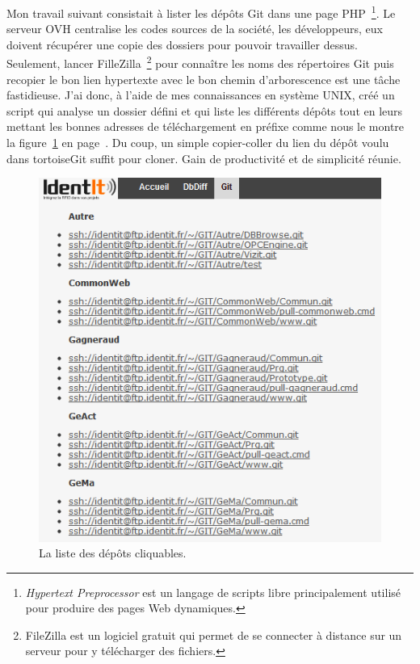     Mon travail suivant consistait à lister les dépôts Git dans une page
    PHP\, \footnote{\emph{Hypertext Preprocessor} est un langage de scripts
    libre principalement utilisé pour produire des pages Web dynamiques.}.
    Le serveur OVH centralise les codes sources de la société, les
    développeurs, eux doivent récupérer une copie des dossiers pour pouvoir
    travailler dessus. Seulement, lancer FilleZilla\, \footnote{FileZilla
    est un logiciel gratuit qui permet de se connecter à distance sur un
    serveur pour y télécharger des fichiers.} pour connaître les noms des
    répertoires Git puis recopier le bon lien hypertexte avec le bon chemin
    d'arborescence est une tâche fastidieuse.  J'ai donc, à l'aide de mes
    connaissances en système UNIX, créé un script qui analyse un dossier
    défini et qui liste les différents dépôts tout en leurs mettant les
    bonnes adresses de téléchargement en préfixe comme nous le montre la
    figure~\ref{repo} en page~\pageref{repo}. Du coup, un simple
    copier-coller du lien du dépôt voulu dans tortoiseGit suffit pour
    cloner. Gain de productivité et de simplicité réunie.

    \begin{figure}
    \begin{center}
    \includegraphics[scale=0.7]{images/repo.png}
    \caption{La liste des dépôts cliquables.}
    \label{repo}
    \end{center}
    \end{figure}

